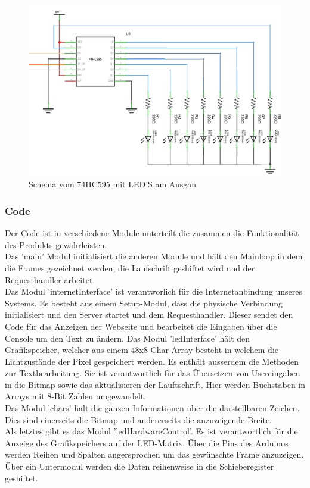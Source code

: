 \documentclass[10pt,a4paper]{article}
\newcommand*\setcaptioncitation[1]{\def\captioncitation{\textit{Source:}~#1}}
\let\captioncitation\relax
\begin{document}
\begin{figure}
\includegraphics[width=\textwidth]{shiftReg.png}
\setcaptioncitation{arduinolearning.com/learning/basics/interfacing-74hc595.php}
\caption{Schema vom 74HC595 mit LED'S am Ausgan}
\end{figure}

\subsubsection{Code}

Der Code ist in verschiedene Module unterteilt die zusammen die Funktionalität des Produkts gewährleisten.\\
Das 'main' Modul initialisiert die anderen Module und hält den Mainloop in dem die Frames gezeichnet werden, die Laufschrift geshiftet wird und der Requesthandler arbeitet.\\
Das Modul 'internetInterface' ist verantworlich für die Internetanbindung unseres Systems. Es besteht aus einem Setup-Modul, dass die physische Verbindung initialisiert und den Server startet und dem Requesthandler. Dieser sendet den Code für das Anzeigen der Webseite und bearbeitet die Eingaben über die Console um den Text zu ändern. 
Das Modul 'ledInterface' hält den Grafikspeicher, welcher aus einem 48x8 Char-Array besteht in welchem die Lichtzustände der Pixel gespeichert werden. Es enthält ausserdem die Methoden zur Textbearbeitung. Sie ist verantwortlich für das Übersetzen von Usereingaben in die Bitmap sowie das aktualisieren der Lauftschrift. Hier werden Buchstaben in Arrays mit 8-Bit Zahlen umgewandelt.\\
Das Modul 'chars' hält die ganzen Informationen über die darstellbaren Zeichen. Dies sind einerseits die Bitmap und andererseits die anzuzeigende Breite.\\
Als letztes gibt es das Modul 'ledHardwareControl'. Es ist verantwortlich für die Anzeige des Grafikspeichers auf der LED-Matrix. Über die Pins des Arduinos werden Reihen und Spalten angersprochen um das gewünschte Frame anzuzeigen. Über ein Untermodul werden die Daten reihenweise in die Schieberegister geshiftet.\\
\end{document}
